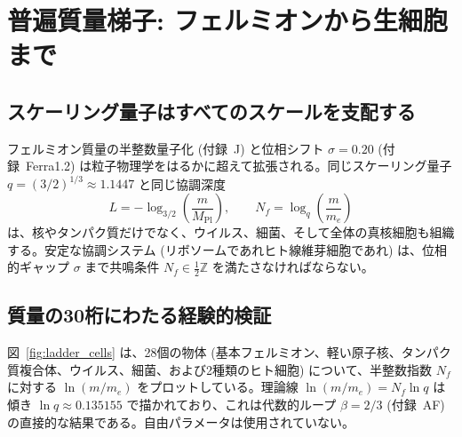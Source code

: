 \documentclass[11pt,a4paper]{article}
\theoremstyle{remark}
\begin{document}
	\section{普遍質量梯子: フェルミオンから生細胞まで}
	\label{sec:ladder_cells}
	
	\subsection{スケーリング量子はすべてのスケールを支配する}
	
	フェルミオン質量の半整数量子化 (付録~J) と位相シフト \(\sigma = 0.20\) (付録~Ferra1.2) は粒子物理学をはるかに超えて拡張される。同じスケーリング量子 \(q = (3/2)^{1/3} \approx 1.1447\) と同じ協調深度
	\[
	L = -\log_{3/2}\left(\frac{m}{M_{\mathrm{Pl}}}\right), \qquad
	N_f = \log_q\left(\frac{m}{m_e}\right)
	\]
	は、核やタンパク質だけでなく、ウイルス、細菌、そして全体の真核細胞も組織する。安定な協調システム (リボソームであれヒト線維芽細胞であれ) は、位相的ギャップ \(\sigma\) まで共鳴条件 \(N_f \in \frac{1}{2}\mathbb{Z}\) を満たさなければならない。
	
	\subsection{質量の30桁にわたる経験的検証}
	
	図~\ref{fig:ladder_cells} は、28個の物体 (基本フェルミオン、軽い原子核、タンパク質複合体、ウイルス、細菌、および2種類のヒト細胞) について、半整数指数 \(N_f\) に対する \(\ln(m/m_e)\) をプロットしている。理論線 \(\ln(m/m_e) = N_f \ln q\) は傾き \(\ln q \approx 0.135155\) で描かれており、これは代数的ループ \(\beta = 2/3\) (付録~AF) の直接的な結果である。自由パラメータは使用されていない。
	
\end{document}
